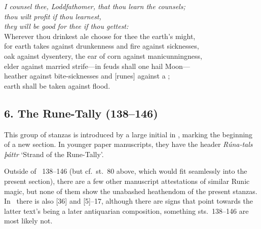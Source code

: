 \bvb \emph{I counsel thee, Loddfathomer, that thou learn the counsels; \\
\ind thou wilt profit if thou learnest, \\
\ind they will be good for thee if thou gettest:} \\
Wherever thou drinkest ale choose for thee the earth’s might, \\
for earth takes against drunkenness and fire against sicknesses, \\
oak against dysentery, the ear of corn against manicunningness, \\
elder against married strife---in feuds shall one hail Moon--- \\
heather against bite-sicknesses and [runes] against a ; \\
\ind earth shall be taken against flood.\evb\evg

\sectionline

\subsection{6. The Rune-Tally (138--146)}

This group of stanzas is introduced by a large initial in \Regius, marking the beginning of a new section.  In younger paper manuscripts, they have the header \emph{Rúna-tals þáttr} ‘Strand of the Rune-Tally’.

Outside of \Havamal\ 138--146 (but cf.~st.~80 above, which would fit seamlessly into the present section), there are a few other manuscript attestations of similar Runic magic, but none of them show the unabashed heathendom of the present stanzas.
In \Regius\ there is also [36] and [5]--17, although there are signs that point towards the latter text’s being a later antiquarian composition, something sts.~138--146 are most likely not.

\sectionline

